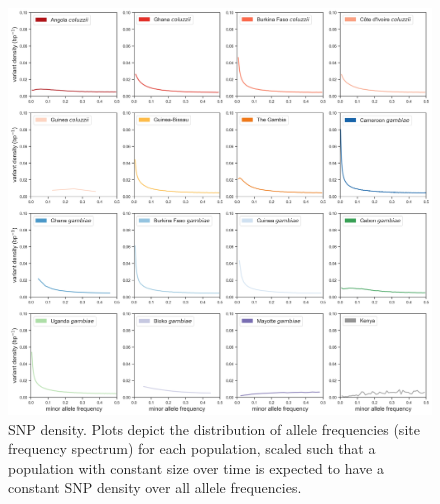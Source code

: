 \documentclass[a4paper,11pt,abstracton,hidelinks]{scrartcl}
\begin{document}
\clearpage

\begin{figure}[H]
	\begin{center}
		\includegraphics*[width=6.3in]{artwork/sfs_supplementary_large.jpg}
	\end{center}
	\caption{SNP density. Plots depict the distribution of allele frequencies (site frequency spectrum) for each population, scaled such that a population with constant size over time is expected to have a constant SNP density over all allele frequencies.}
	\label{fig:sfs}
\end{figure}


\clearpage
\end{document}
